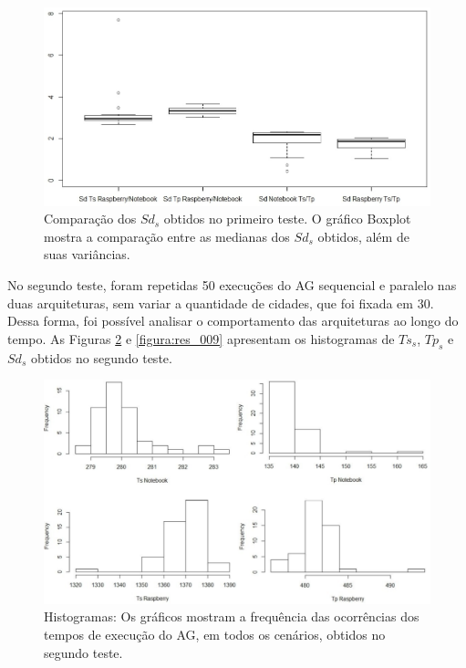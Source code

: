\begin{figure}[htb]  
	\centering
	\includegraphics[width=.95\textwidth]{figuras/res_007_20sd}
	\caption[Comparação dos $Sd_s$ obtidos no primeiro teste]{Comparação dos $Sd_s$ obtidos no primeiro teste. O gráfico Boxplot mostra a comparação entre as medianas dos $Sd_s$ obtidos, além de suas variâncias.}
	\label{figura:res_007}
\end{figure} 

No segundo teste, foram repetidas 50 execuções do AG sequencial e paralelo nas duas arquiteturas, sem variar a quantidade de cidades, que foi fixada em 30. Dessa forma, foi possível analisar o comportamento das arquiteturas ao longo do tempo. As Figuras \ref{figura:res_008} e \ref{figura:res_009} apresentam os histogramas de $Ts_s$, $Tp_s$ e $Sd_s$ obtidos no segundo teste.

\begin{figure}[htb]  
	\centering
	\includegraphics[width=.95\textwidth]{figuras/res_008_50tp}
	\caption[Histogramas dos tempos de execução obtidos]{Histogramas: Os gráficos mostram a frequência das ocorrências dos tempos de execução do AG, em todos os cenários, obtidos no segundo teste.}
	\label{figura:res_008}
\end{figure} 

